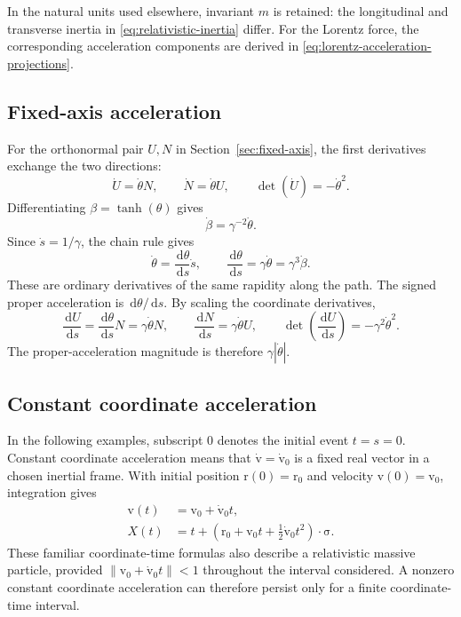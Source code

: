 \documentclass[11pt]{article}
\newcommand{\pv}[1]{{#1}}
\newcommand{\vstyle}[1]{{\bm{\mathrm{#1}}}}
\newcommand{\pN}{\pv{N}}
\newcommand{\pU}{\pv{U}}
\newcommand{\pX}{\pv{X}}
\numberwithin{equation}{section}
\newcommand{\dotprod}{\cdot}
\newcommand{\bsig}{\vstyle{\sigma}}
\newcommand{\br}{\vstyle{r}}
\newcommand{\bv}{\vstyle{v}}
\newcommand{\dd}{\,\mathrm d}
\begin{document}
In the natural units used elsewhere,
invariant $m$ is retained: the longitudinal and transverse inertia in
\eqref{eq:relativistic-inertia} differ.
For the Lorentz force, the corresponding acceleration components are
derived in \eqref{eq:lorentz-acceleration-projections}.

\subsection{Fixed-axis acceleration}
\label{sec:fixed-axis-acceleration}
For the orthonormal pair $\pU,\pN$ in Section~\ref{sec:fixed-axis},
the first derivatives exchange the two directions:
\[
 \dot{\pU}=\dot{\theta}\pN,\qquad
 \dot{\pN}=\dot{\theta}\pU,\qquad
 \det(\dot{\pU})=-\dot{\theta}^2.
\]
Differentiating $\beta=\tanh(\theta)$ gives
\[
 \dot{\beta}=\gamma^{-2}\dot{\theta}.
\]
Since $\dot{s}=1/\gamma$, the chain rule gives
\[
 \dot{\theta}=\frac{\dd\theta}{\dd s}\dot{s},\qquad
 \frac{\dd\theta}{\dd s}=\gamma\dot{\theta}=\gamma^3\dot{\beta}.
\]
These are ordinary derivatives of the same rapidity along the path.
The signed proper acceleration is $\dd\theta/\dd s$.
By scaling the coordinate derivatives,
\[
 \frac{\dd\pU}{\dd s}=\frac{\dd\theta}{\dd s}\pN=\gamma\dot{\theta}\pN,\qquad
 \frac{\dd\pN}{\dd s}=\gamma\dot{\theta}\pU,\qquad
 \det\left(\frac{\dd\pU}{\dd s}\right)=-\gamma^2\dot{\theta}^2.
\]
The proper-acceleration magnitude is therefore $\gamma|\dot\theta|$.

\subsection{Constant coordinate acceleration}
\label{sec:constant-coordinate-acceleration}
In the following examples, subscript $0$ denotes the initial event $t=s=0$.
Constant coordinate acceleration means that $\dot{\bv}=\dot{\bv}_0$
is a fixed real vector in a chosen inertial frame. With initial position
$\br(0)=\br_0$ and velocity $\bv(0)=\bv_0$, integration gives
\begin{align}
 \bv(t)&=\bv_0+\dot{\bv}_0t,\\
 \pX(t)&=t+(\br_0+\bv_0t+\tfrac12\dot{\bv}_0t^2)\dotprod\bsig.
 \label{eq:constant-coordinate-acceleration-worldline}
\end{align}
These familiar coordinate-time formulas also describe a relativistic
massive particle, provided $\lVert\bv_0+\dot{\bv}_0t\rVert<1$ throughout the
interval considered. A nonzero constant coordinate acceleration can
therefore persist only for a finite coordinate-time interval.
\end{document}
